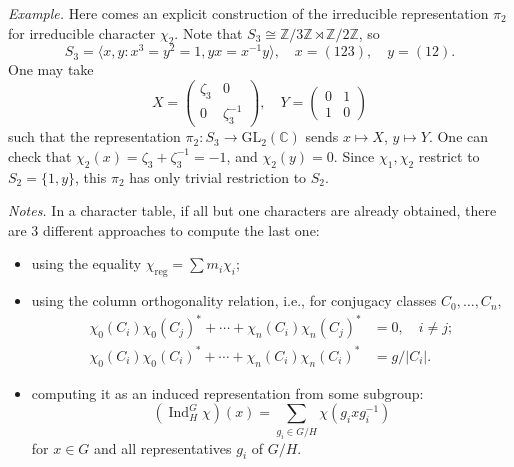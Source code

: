 \documentclass{mathproblems}
\newcommand\C{\mathbb{C}}
\newcommand\Z{\mathbb{Z}}
\newcommand\GL{\mathrm{GL}}
\DeclareMathOperator{\Ind}{Ind}
\begin{document}
\begin{questions}
\textit{Example.} Here comes an explicit construction of the irreducible representation $\pi_2$ for irreducible character $\chi_2$. Note that $S_3\cong \Z/3\Z\rtimes \Z/2\Z$, so
$$
S_3=\langle x,y: x^3=y^2=1, yx=x^{-1}y \rangle,\quad x=(123),\quad y=(12).
$$
One may take
$$
X=\begin{pmatrix}
\zeta_3 & 0 \\
0 & \zeta_3^{-1}
\end{pmatrix},\quad 
Y=\begin{pmatrix}
0 & 1\\ 1 & 0
\end{pmatrix}
$$
such that the representation $\pi_2:S_3\to \GL_2(\C)$ sends $x\mapsto X$, $y\mapsto Y$. One can check that $\chi_2(x)=\zeta_3+\zeta_3^{-1}=-1$, and $\chi_2(y)=0$. Since $\chi_1,\chi_2$ restrict to $S_2=\{1,y\}$, this $\pi_2$ has only trivial restriction to $S_2$.


{\color{violet}
\textit{Notes.} In a character table, if all but one characters are already obtained, there are 3 different approaches to compute the last one:
\begin{itemize}
    \item using the equality $\chi_{\operatorname{reg}}=\sum m_i \chi_i$;
    \item using the column orthogonality relation, i.e., for conjugacy classes $C_0,\ldots,C_n$,
    $$
    \begin{aligned}
    \chi_0(C_i)\chi_0(C_j)^*+\cdots+\chi_n(C_i)\chi_n(C_j)^*&=0,\quad i\neq j;\\
    \chi_0(C_i)\chi_0(C_i)^*+\cdots+\chi_n(C_i)\chi_n(C_i)^*&=g/|C_i|.
    \end{aligned}
    $$
    \item computing it as an induced representation from some subgroup:
    $$
    (\Ind_H^G \chi)(x)= \sum_{g_i\in G/H} \chi(g_i x g_i^{-1})
    $$
    for $x\in G$ and all representatives $g_i$ of $G/H$.
\end{itemize}
}


\end{questions}
\end{document}
